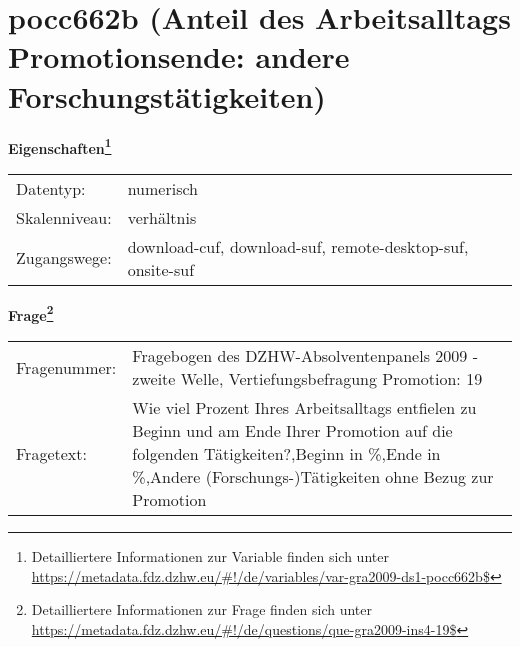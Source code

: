 
    \setcounter{footnote}{0}

    \vspace*{-1.8cm}
	\section{pocc662b (Anteil des Arbeitsalltags Promotionsende: andere Forschungstätigkeiten)}
	\label{section:pocc662b}



    \vspace*{0.5cm}
    \noindent\textbf{Eigenschaften\footnote{Detailliertere Informationen zur Variable finden sich unter
		\url{https://metadata.fdz.dzhw.eu/\#!/de/variables/var-gra2009-ds1-pocc662b$}}}\\
	\begin{tabularx}{\hsize}{@{}lX}
	Datentyp: & numerisch \\
	Skalenniveau: & verhältnis \\
	Zugangswege: &
	  download-cuf, 
	  download-suf, 
	  remote-desktop-suf, 
	  onsite-suf
 \\
    \end{tabularx}



				\vspace*{0.5cm}
                \noindent\textbf{Frage\footnote{Detailliertere Informationen zur Frage finden sich unter
		              \url{https://metadata.fdz.dzhw.eu/\#!/de/questions/que-gra2009-ins4-19$}}}\\
				\begin{tabularx}{\hsize}{@{}lX}
					Fragenummer: &
					  Fragebogen des DZHW-Absolventenpanels 2009 - zweite Welle, Vertiefungsbefragung Promotion:
					  19
 \\
					Fragetext: & Wie viel Prozent Ihres Arbeitsalltags entfielen zu Beginn und am Ende Ihrer Promotion auf die folgenden Tätigkeiten?,Beginn in \%,Ende in \%,Andere (Forschungs-)Tätigkeiten ohne Bezug zur Promotion \\
				\end{tabularx}





